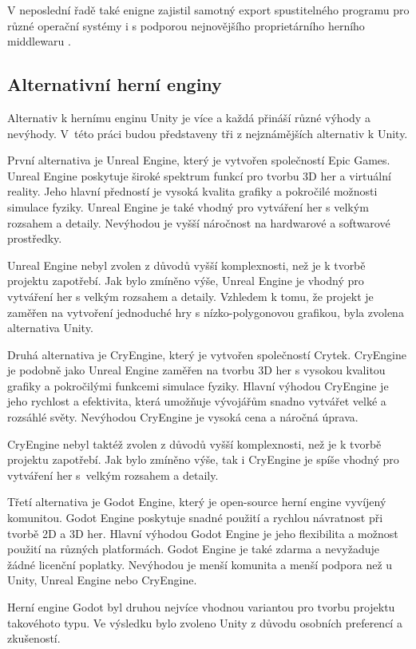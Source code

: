 V neposlední řadě také enigne zajistil samotný export spustitelného programu pro různé operační systémy i s podporou nejnovějšího proprietárního herního middlewaru \cite{unity_api}.

\subsection{Alternativní herní enginy}

Alternativ k hernímu enginu Unity je více a každá přináší různé výhody a nevýhody. V~této práci budou představeny tři z nejznámějších alternativ k Unity.

První alternativa je Unreal Engine, který je vytvořen společností Epic Games. Unreal Engine poskytuje široké spektrum funkcí pro tvorbu 3D her a virtuální reality. Jeho hlavní předností je vysoká kvalita grafiky a pokročilé možnosti simulace fyziky. Unreal Engine je také vhodný pro vytváření her s velkým rozsahem a detaily. Nevýhodou je vyšší náročnost na hardwarové a softwarové prostředky. \cite{unreal_engine}

Unreal Engine nebyl zvolen z důvodů vyšší komplexnosti, než je k tvorbě projektu zapotřebí. Jak bylo zmíněno výše, Unreal Engine je vhodný pro vytváření her s velkým rozsahem a detaily. Vzhledem k tomu, že projekt je zaměřen na vytvoření jednoduché hry s nízko-polygonovou grafikou, byla zvolena alternativa Unity.

Druhá alternativa je CryEngine, který je vytvořen společností Crytek. CryEngine je podobně jako Unreal Engine zaměřen na tvorbu 3D her s vysokou kvalitou grafiky a pokročilými funkcemi simulace fyziky. Hlavní výhodou CryEngine je jeho rychlost a efektivita, která umožňuje vývojářům snadno vytvářet velké a rozsáhlé světy. Nevýhodou CryEngine je vysoká cena a náročná úprava. \cite{cryengine}

CryEngine nebyl taktéž zvolen z důvodů vyšší komplexnosti, než je k tvorbě projektu zapotřebí. Jak bylo zmíněno výše, tak i CryEngine je spíše vhodný pro vytváření her s~velkým rozsahem a detaily. 

Třetí alternativa je Godot Engine, který je open-source herní engine vyvíjený komunitou. Godot Engine poskytuje snadné použití a rychlou návratnost při tvorbě 2D a 3D her. Hlavní výhodou Godot Engine je jeho flexibilita a možnost použití na různých platformách. Godot Engine je také zdarma a nevyžaduje žádné licenční poplatky. Nevýhodou je menší komunita a menší podpora než u Unity, Unreal Engine nebo CryEngine. \cite{godot}

Herní engine Godot byl druhou nejvíce vhodnou variantou pro tvorbu projektu takovéhoto typu. Ve výsledku bylo zvoleno Unity z důvodu osobních preferencí a zkušeností.